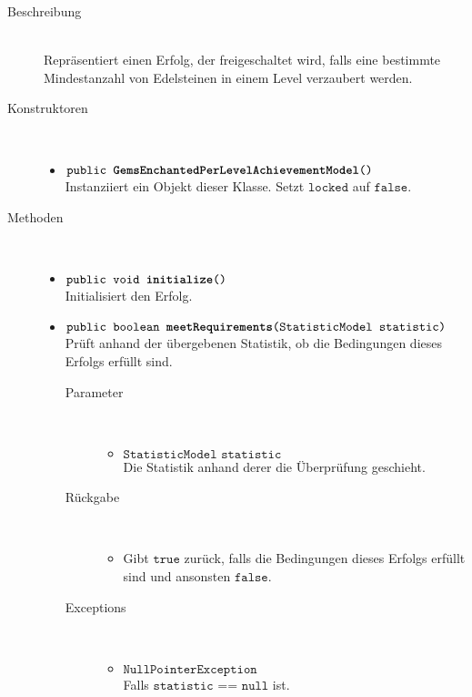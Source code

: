 \begin{description}
\item[Beschreibung] \hfill \\ Repräsentiert einen Erfolg, der freigeschaltet wird, falls eine bestimmte Mindestanzahl von Edelsteinen in einem Level verzaubert werden.
	
\item[Konstruktoren] \hfill \\
	\vspace{-.8cm}
	\begin{itemize}
		\item $\texttt{public \textbf{GemsEnchantedPerLevelAchievementModel}()}$ \\ Instanziiert ein Objekt dieser Klasse. Setzt $\texttt{locked}$ auf $\texttt{false}$.
	\end{itemize}
	
\item[Methoden] \hfill \\
	\vspace{-.8cm}
	\begin{itemize}
				\item $\texttt{public void \textbf{initialize}()}$ \\ Initialisiert den Erfolg.
		
		\item $\texttt{public boolean \textbf{meetRequirements}(StatisticModel statistic)}$ \\ Prüft anhand der übergebenen Statistik, ob die Bedingungen dieses Erfolgs erfüllt sind.
		\begin{description}
		\item[Parameter] \hfill \\
			\vspace{-.8cm}
			\begin{itemize}
				\item $\texttt{StatisticModel statistic}$ \\ Die Statistik anhand derer die Überprüfung geschieht. 
			\end{itemize}
			\item[Rückgabe] \hfill \\
			\vspace{-.8cm}
			\begin{itemize}
				\item Gibt $\texttt{true}$ zurück, falls die Bedingungen dieses Erfolgs erfüllt sind und ansonsten $\texttt{false}$.
			\end{itemize}
			\item[Exceptions] \hfill \\
			\vspace{-.8cm}
			\begin{itemize}
				\item $\texttt{NullPointerException}$ \\ Falls $\texttt{statistic == null}$ ist.
			\end{itemize}
		\end{description}
	\end{itemize}
\end{description}

